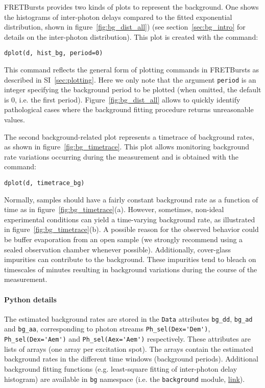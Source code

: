 FRETBursts provides two kinds of plots to represent the background. One shows the histograms
of inter-photon delays compared to the fitted exponential distribution, shown in
figure~\ref{fig:bg_dist_all}) (see section~\ref{sec:bg_intro} for details on the inter-photon distribution).
This plot is created with the command:

\begin{lstlisting}
dplot(d, hist_bg, period=0)
\end{lstlisting}

This command reflects the general form of plotting commands in FRETBursts
as described in SI~\ref{sec:plotting}.
Here we only note that the argument \verb|period| is an integer specifying the background
period to be plotted (when omitted, the default is 0, i.e. the first period).
Figure~\ref{fig:bg_dist_all} allows to quickly identify pathological cases where the
background fitting procedure returns unreasonable values.

The second background-related plot represents a timetrace of background rates,
as shown in figure~\ref{fig:bg_timetrace}. This plot allows monitoring background rate variations
occurring during the measurement and is obtained with the command:

\begin{lstlisting}
dplot(d, timetrace_bg)
\end{lstlisting}

Normally, samples should have a fairly constant background rate as a function of time
as in figure~\ref{fig:bg_timetrace}(a). However, sometimes, non-ideal
experimental conditions can yield a time-varying background rate, as illustrated in
figure~\ref{fig:bg_timetrace}(b).
A possible reason for the observed behavior could be buffer evaporation from an open sample
(we strongly recommend using a sealed 
observation chamber whenever possible). Additionally,
cover-glass impurities can contribute to the background.
These impurities tend to bleach on timescales of minutes resulting in
background variations during the course of the measurement.

\paragraph{Python details}

The estimated background rates are stored in the \verb|Data| attributes
\verb|bg_dd|, \verb|bg_ad| and \verb|bg_aa|, corresponding to photon
streams \verb|Ph_sel(Dex='Dem')|, \verb|Ph_sel(Dex='Aem')| and \verb|Ph_sel(Aex='Aem')|
respectively.
These attributes are lists of arrays (one array per excitation spot).
The arrays contain the estimated background rates in the different time windows
(background periods).
Additional background fitting functions (e.g. least-square fitting of inter-photon delay
histogram) are available in \verb|bg| namespace
(i.e. the \verb|background| module,
\href{http://fretbursts.readthedocs.org/en/latest/background.html}{link}).
